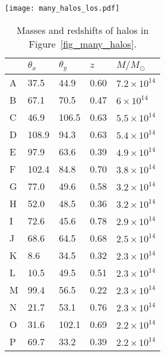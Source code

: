 \begin{figure*}%
 \centering
 \texttt{[image: many\_halos\_los.pdf]} 
 \caption{
   Reconstruction of an artificial shear field with the 
   SVD filter \textit{(top panels)}, 
   Transverse Wiener filter \textit{(middle panels)}, 
   and Radial Wiener filter \textit{(bottom panels)}.  
   The left column shows the projected density reconstruction
   across the field using each method, all
   smoothed with a 1-pixel wide Gaussian filter.  
   Red circles indicate the true locations of the input halos.
   The right column shows the line-of-sight distributions of the
   twelve most massive NFW halos, labeled A-L.  The masses and redshifts of
   the halos are listed in Table~\ref{halo_table}.
   The signal suppression of the transverse Wiener filter seen in 
   Figure~\ref{fig_los_plot_ST} is apparent in the color-bar scaling
   of the middle panels. The anomalous results seen in halo K are due to
   its proximity to the deweighted border.  As suggested by the discussion
   in Section~\ref{SN_modes}, none of the three methods succeed 
   in recovering precise redshifts of the halos.
  \label{fig_many_halos} }
\end{figure*} 

\begin{table}
\centering
\caption{Masses and redshifts of halos in Figure~\ref{fig_many_halos}.}
\label{halo_table}
\begin{tabular}{lllll}
\hline
& $\theta_x$ & $\theta_y$ & $z$ & $M/M_\odot$ \\
\hline
  A & 37.5 & 44.9 & 0.60 & $7.2\times 10^{14}$ \\
  B & 67.1 & 70.5 & 0.47 & $6\times 10^{14}$ \\
  C & 46.9 & 106.5 & 0.63 & $5.5\times 10^{14}$ \\
  D & 108.9 & 94.3 & 0.63 & $5.4\times 10^{14}$ \\
  E & 97.9 & 63.6 & 0.39 & $4.9\times 10^{14}$ \\
  F & 102.4 & 84.8 & 0.70 & $3.8\times 10^{14}$ \\
  G & 77.0 & 49.6 & 0.58 & $3.2\times 10^{14}$ \\
  H & 52.0 & 48.5 & 0.36 & $3.2\times 10^{14}$ \\
  I & 72.6 & 45.6 & 0.78 & $2.9\times 10^{14}$ \\
  J & 68.6 & 64.5 & 0.68 & $2.5\times 10^{14}$ \\
  K & 8.6 & 34.5 & 0.32 & $2.3\times 10^{14}$ \\
  L & 10.5 & 49.5 & 0.51 & $2.3\times 10^{14}$ \\
  M & 99.4 & 56.5 & 0.22 & $2.3\times 10^{14}$ \\
  N & 21.7 & 53.1 & 0.76 & $2.3\times 10^{14}$ \\
  O & 31.6 & 102.1 & 0.69 & $2.2\times 10^{14}$ \\
  P & 69.7 & 33.2 & 0.39 & $2.2\times 10^{14}$ \\
\hline
\end{tabular}
\end{table} 


